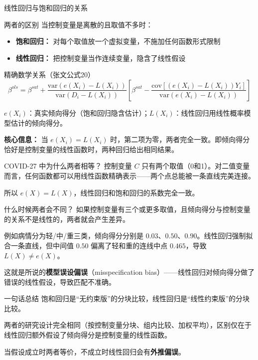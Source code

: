 \begin{frame}[allowframebreaks]{线性回归与饱和回归的关系}

  \begin{block}{两者的区别}
    当控制变量是离散的且取值不多时：
    \begin{itemize}
      \item \textbf{饱和回归：} 对每个取值放一个虚拟变量，不施加任何函数形式限制
      \item \textbf{线性回归：} 把控制变量当作连续变量，隐含了线性假设
    \end{itemize}
  \end{block}

  \begin{block}{精确数学关系（张文公式20）}
    $$\beta^{ols} = \beta^{sat} + \frac{\text{var}(e(X_i) - L(X_i))}{\text{var}(D_i - L(X_i))} \left[\beta^{sat} - \frac{\text{cov}[(e(X_i) - L(X_i))Y_i]}{\text{var}(e(X_i) - L(X_i))}\right]$$

    \medskip
    \footnotesize
    $e(X_i)$：真实倾向得分（饱和回归隐含估计）；$L(X_i)$：线性回归用线性概率模型估计的倾向得分。

    \medskip
    \normalsize
    \textbf{核心信息：} 当 $e(X_i) = L(X_i)$ 时，第二项为零，两者完全一致。即倾向得分恰好是控制变量的线性函数时，两种回归给出相同结果。
  \end{block}

  \begin{exampleblock}{COVID-27 中为什么两者相等？}
    控制变量 $C$ 只有两个取值（0和1）。对二值变量而言，任何函数都可以用线性函数精确表示——两个点总能被一条直线完美连接。

    \medskip

    所以 $e(X) = L(X)$，线性回归和饱和回归的系数完全一致。
  \end{exampleblock}

  \begin{alertblock}{什么时候两者会不同？}
    如果控制变量有三个或更多取值，且倾向得分与控制变量的关系不是线性的，两者就会产生差异。

    \medskip

    例如病情分为轻/中/重三类，倾向得分分别是 $0.03$、$0.50$、$0.90$。线性回归强制拟合一条直线，但中间值 $0.50$ 偏离了轻和重的连线中点 $0.465$，导致 $L(X) \neq e(X)$。

    \medskip

    这就是\parencite{GLSJ202510012}所说的\textbf{模型误设偏误}（misspecification bias）——线性回归对倾向得分做了错误的线性假设，导致匹配不准确。
  \end{alertblock}

  \begin{block}{一句话总结}
    饱和回归是``无约束版''的分块比较，线性回归是``线性约束版''的分块比较。
    \medskip

    两者的研究设计完全相同（按控制变量分块、组内比较、加权平均），区别仅在于线性回归额外假设了倾向得分是控制变量的线性函数。

    \medskip
    当假设成立时两者等价，不成立时线性回归会有\textbf{外推偏误}。
  \end{block}
\end{frame}